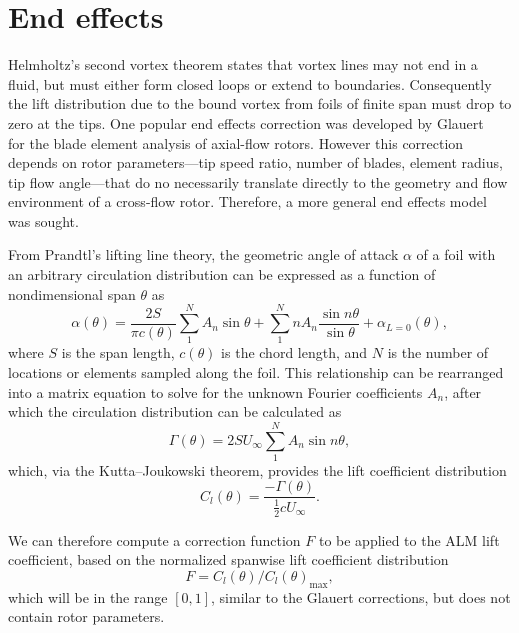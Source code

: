 \documentclass[times]{weauth}
\begin{document}
\section{End effects}

Helmholtz's second vortex theorem states that vortex lines may not end in a
fluid, but must either form closed loops or extend to boundaries. Consequently
the lift distribution due to the bound vortex from foils of finite span must
drop to zero at the tips. One popular end effects correction was developed by
Glauert~\cite{Glauert1935} for the blade element analysis of axial-flow rotors.
However this correction depends on rotor parameters---tip speed ratio, number of
blades, element radius, tip flow angle---that do no necessarily translate
directly to the geometry and flow environment of a cross-flow rotor. Therefore,
a more general end effects model was sought.

From Prandtl's lifting line theory, the geometric angle of attack $\alpha$ of a
foil with an arbitrary circulation distribution can be expressed as a function
of nondimensional span $\theta$ as \cite{Anderson2001}
\begin{equation}
    \alpha (\theta) = \frac{2S}{\pi c (\theta)}
    \sum_1^N A_n \sin \theta
    + \sum_1^N n A_n \frac{\sin n \theta}{\sin \theta}
    + \alpha_{L = 0}(\theta),
    \label{eq:lifting-line}
\end{equation}
where $S$ is the span length, $c(\theta)$ is the chord length, and $N$ is the
number of locations or elements sampled along the foil. This relationship can be
rearranged into a matrix equation to solve for the unknown Fourier coefficients
$A_n$, after which the circulation distribution can be calculated as
\begin{equation}
    \Gamma (\theta) = 2SU_\infty \sum_1^N A_n \sin n \theta,
\end{equation}
which, via the Kutta--Joukowski theorem, provides the lift coefficient
distribution
\begin{equation}
    C_l(\theta) = \frac{-\Gamma (\theta)}{\frac{1}{2} c U_\infty}.
\end{equation}

We can therefore compute a correction function $F$ to be applied to the ALM lift
coefficient, based on the normalized spanwise lift coefficient distribution
\begin{equation}
    F = C_l(\theta)/C_l(\theta)_{\max},
\end{equation}
which will be in the range $[0, 1]$, similar to the Glauert corrections, but
does not contain rotor parameters.
\end{document}

